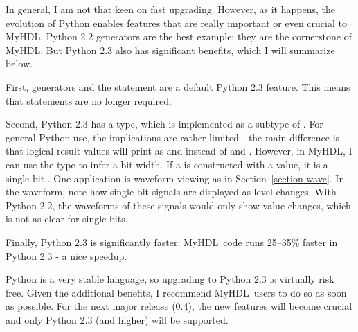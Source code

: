 \documentclass{howto}
\newcommand{\myhdl}{\protect \mbox{MyHDL}}
\begin{document}
In general, I am not that keen on fast upgrading. However, as it
happens, the evolution of Python enables features that are really
important or even crucial to \myhdl{}.  Python 2.2 generators are the
best example: they are the cornerstone of \myhdl{}. But Python 2.3
also has significant benefits, which I will summarize below.

First, generators and the  statement are a default Python
2.3 feature. This means that 
statements are no longer required.

Second, Python 2.3 has a  type, which is implemented as a
subtype of . For general Python use, the implications are
rather limited - the main difference is that logical result values will
print as  and  instead of  and
. However, in \myhdl{}, I can use the  type to infer
a bit width.  If a  is constructed with a 
value, it is a single bit . One application is waveform
viewing as in Section~\ref{section-wave}. In the waveform, note how
single bit signals are displayed as level changes.  With Python 2.2,
the waveforms of these signals would only show value changes,
which is not as clear for single bits.

Finally, Python 2.3 is significantly faster. \myhdl\ code runs
25--35\% faster in Python 2.3 - a nice speedup.

Python is a very stable language, so upgrading to Python 2.3 is
virtually risk free. Given the additional benefits, I recommend
\myhdl\ users to do so as soon as possible. For the next major release
(0.4), the new features will become crucial and only Python 2.3 (and
higher) will be supported.
\end{document}
